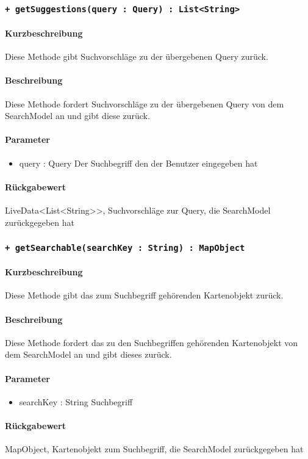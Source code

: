 \subsubsection{\texttt{+ getSuggestions(query : Query) : List<String>}}%
\paragraph*{Kurzbeschreibung}
Diese Methode gibt Suchvorschläge zu der übergebenen Query zurück.
\paragraph*{Beschreibung}
Diese Methode fordert Suchvorschläge zu der übergebenen Query von dem SearchModel an und gibt diese zurück.
\paragraph*{Parameter}
\begin{itemize}
    \item query : Query Der Suchbegriff den der Benutzer eingegeben hat
\end{itemize}
\paragraph*{Rückgabewert}
LiveData<List<String>>, Suchvorschläge zur Query, die SearchModel zurückgegeben hat

\subsubsection{\texttt{+ getSearchable(searchKey : String) : MapObject}}%
\paragraph*{Kurzbeschreibung}
Diese Methode gibt das zum Suchbegriff gehörenden Kartenobjekt zurück.
\paragraph*{Beschreibung}
Diese Methode fordert das zu den Suchbegriffen gehörenden Kartenobjekt von dem SearchModel an und gibt dieses zurück.
\paragraph*{Parameter}
\begin{itemize}
    \item searchKey : String Suchbegriff
\end{itemize}
\paragraph*{Rückgabewert}
MapObject, Kartenobjekt zum Suchbegriff, die SearchModel zurückgegeben hat